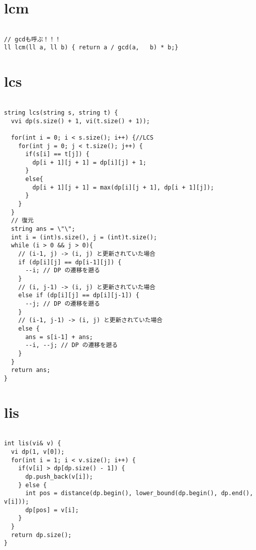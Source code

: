 \documentclass[a4j,titlepage]{jarticle} %
\begin{document}
\color{white}
\section{lcm}
\color{black}
\begin{lstlisting}[caption=lcm]

// gcdも呼ぶ！！！
ll lcm(ll a, ll b) { return a / gcd(a,   b) * b;}

\end{lstlisting}

\color{white}
\section{lcs}
\color{black}
\begin{lstlisting}[caption=lcs]

string lcs(string s, string t) {
  vvi dp(s.size() + 1, vi(t.size() + 1));
  
  for(int i = 0; i < s.size(); i++) {//LCS
    for(int j = 0; j < t.size(); j++) {
      if(s[i] == t[j]) {
        dp[i + 1][j + 1] = dp[i][j] + 1;
      }
      else{
        dp[i + 1][j + 1] = max(dp[i][j + 1], dp[i + 1][j]);
      }
    }
  }
  // 復元
  string ans = \"\";
  int i = (int)s.size(), j = (int)t.size();
  while (i > 0 && j > 0){
    // (i-1, j) -> (i, j) と更新されていた場合
    if (dp[i][j] == dp[i-1][j]) {
      --i; // DP の遷移を遡る
    }
    // (i, j-1) -> (i, j) と更新されていた場合
    else if (dp[i][j] == dp[i][j-1]) {
      --j; // DP の遷移を遡る
    }
    // (i-1, j-1) -> (i, j) と更新されていた場合
    else {
      ans = s[i-1] + ans;
      --i, --j; // DP の遷移を遡る
    }
  }
  return ans;
}

\end{lstlisting}

\color{white}
\section{lis}
\color{black}
\begin{lstlisting}[caption=lis]

int lis(vi& v) {
  vi dp(1, v[0]);
  for(int i = 1; i < v.size(); i++) {
    if(v[i] > dp[dp.size() - 1]) {
      dp.push_back(v[i]);
    } else {
      int pos = distance(dp.begin(), lower_bound(dp.begin(), dp.end(), v[i]));
      dp[pos] = v[i];
    }
  }
  return dp.size();
}

\end{lstlisting}

\color{white}
\end{document}
